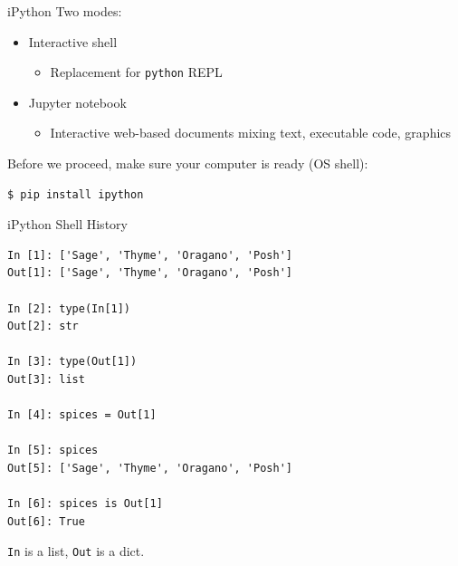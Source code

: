 \documentclass[smaller, aspectratio=1610]{beamer}
\begin{document}
\begin{frame}[label={sec:orgbef14ac},fragile]{iPython}
 Two modes:

\begin{itemize}
\item Interactive shell

\begin{itemize}
\item Replacement for \texttt{python} REPL
\end{itemize}

\item Jupyter notebook

\begin{itemize}
\item Interactive web-based documents mixing text, executable code, graphics
\end{itemize}
\end{itemize}

Before we proceed, make sure your computer is ready (OS shell):

\lstset{language=sh,label= ,caption= ,captionpos=b,numbers=none}
\begin{lstlisting}
$ pip install ipython
\end{lstlisting}
\end{frame}

\begin{frame}[label={sec:orgfa41bfb},fragile]{iPython Shell History}
 \lstset{language=sh,label= ,caption= ,captionpos=b,numbers=none}
\begin{lstlisting}
In [1]: ['Sage', 'Thyme', 'Oragano', 'Posh']
Out[1]: ['Sage', 'Thyme', 'Oragano', 'Posh']

In [2]: type(In[1])
Out[2]: str

In [3]: type(Out[1])
Out[3]: list

In [4]: spices = Out[1]

In [5]: spices
Out[5]: ['Sage', 'Thyme', 'Oragano', 'Posh']

In [6]: spices is Out[1]
Out[6]: True
\end{lstlisting}

\texttt{In} is a list, \texttt{Out} is a dict.
\end{frame}
\end{document}
